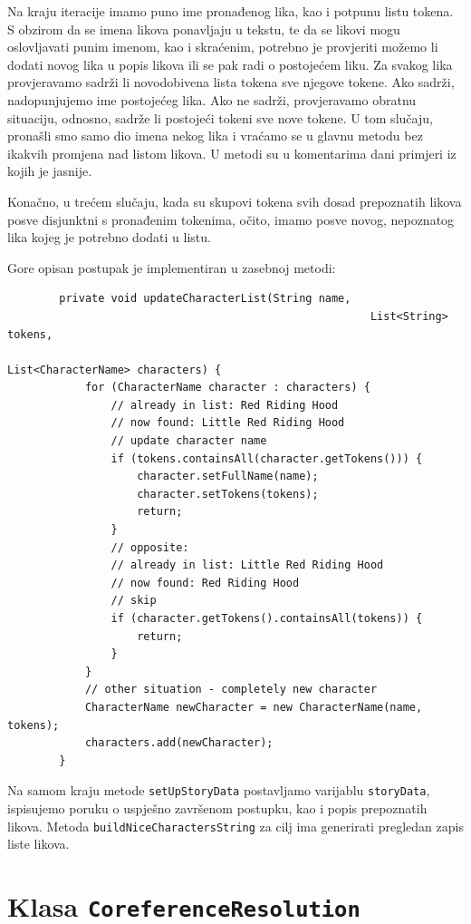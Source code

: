 \documentclass[a4paper,twoside,12pt]{memoir} %
\begin{document}
		Na kraju iteracije imamo puno ime pronađenog lika, kao i potpunu listu tokena. S obzirom da se imena likova ponavljaju u tekstu, te da se likovi mogu oslovljavati punim imenom, kao i skraćenim, potrebno je provjeriti možemo li dodati novog lika u popis likova ili se pak radi o postojećem liku. Za svakog lika provjeravamo sadrži li novodobivena lista tokena sve njegove tokene. Ako sadrži, nadopunjujemo ime postojećeg lika. Ako ne sadrži, provjeravamo obratnu situaciju, odnosno, sadrže li postojeći tokeni sve nove tokene. U tom slučaju, pronašli smo samo dio imena nekog lika i vraćamo se u glavnu metodu bez ikakvih promjena nad listom likova. U metodi su u komentarima dani primjeri iz kojih je jasnije.

		Konačno, u trećem slučaju, kada su skupovi tokena svih dosad prepoznatih likova posve disjunktni s pronađenim tokenima, očito, imamo posve novog, nepoznatog lika kojeg je potrebno dodati u listu.

		Gore opisan postupak je implementiran u zasebnoj metodi:

		\begin{lstlisting}
		private void updateCharacterList(String name,
														List<String> tokens,
														List<CharacterName> characters) {
			for (CharacterName character : characters) {
				// already in list: Red Riding Hood
				// now found: Little Red Riding Hood
				// update character name
				if (tokens.containsAll(character.getTokens())) {
					character.setFullName(name);
					character.setTokens(tokens);
					return;
				}
				// opposite:
				// already in list: Little Red Riding Hood
				// now found: Red Riding Hood
				// skip
				if (character.getTokens().containsAll(tokens)) {
					return;
				}
			}
			// other situation - completely new character
			CharacterName newCharacter = new CharacterName(name, tokens);
			characters.add(newCharacter);
		}
		\end{lstlisting}

		Na samom kraju metode \texttt{setUpStoryData} postavljamo varijablu \texttt{storyData}, ispisujemo poruku o uspješno završenom postupku, kao i popis prepoznatih likova. Metoda \texttt{buildNiceCharactersString} za cilj ima generirati pregledan zapis liste likova.

		\newpage

	\section{Klasa \texttt{CoreferenceResolution}}
\end{document}
